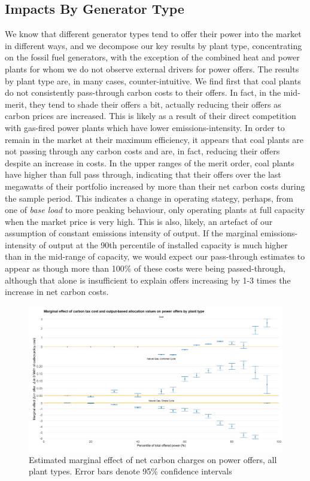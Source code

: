 \documentclass[12pt]{article}
\begin{document}
\subsection{Impacts By Generator Type}
We know that different generator types tend to offer their power into the market in different ways, and we decompose our key results by plant type, concentrating on the fossil fuel generators, with the exception of the combined heat and power plants for whom we do not observe external drivers for power offers. The results by plant type are, in many cases, counter-intuitive. We find first that coal plants do not consistently pass-through carbon costs to their offers. In fact, in the mid-merit, they tend to shade their offers a bit, actually reducing their offers as carbon prices are increased. This is likely as a result of their direct competition with gas-fired power plants which have lower emissions-intensity. In order to remain in the market at their maximum efficiency, it appears that coal plants are not passing through any carbon costs and are, in fact, reducing their offers despite an increase in costs. In the upper ranges of the merit order, coal plants have higher than full pass through, indicating that their offers over the last megawatts of their portfolio increased by more than their net carbon costs during the sample period. This indicates a change in operating stategy, perhaps, from one of \textit{base load} to more peaking behaviour, only operating plants at full capacity when the market price is very high. This is also, likely, an artefact of our assumption of constant emissions intensity of output. If the marginal emissions-intensity of output at the 90th percentile of installed capacity is much higher than in the mid-range of capacity, we would expect our pass-through estimates to appear as though more than 100\% of these costs were being passed-through, although that alone is insufficient to explain offers increasing by 1-3 times the increase in net carbon costs.

\begin{figure}[!htb]
    \centering
     \includegraphics[width=.9\textwidth]{../images/by_type.png}
    \caption{Estimated marginal effect of net carbon charges on power offers, all plant types. Error bars denote 95\% confidence intervals}
    \label{fig:decomp_peaks}
\end{figure}
\end{document}
